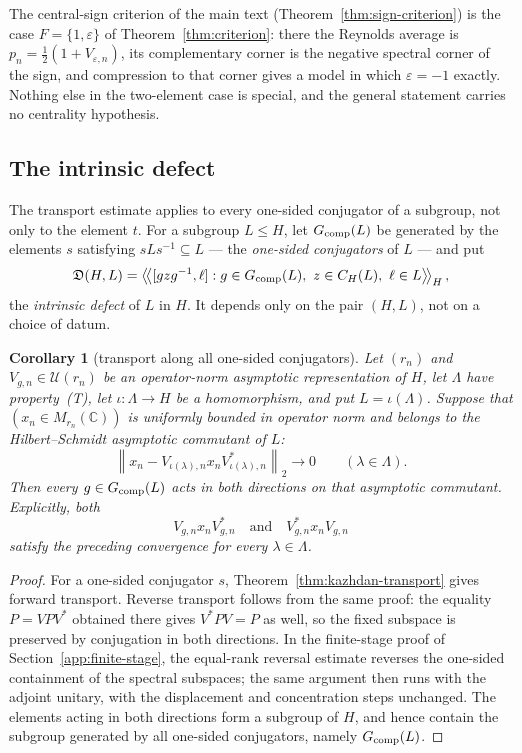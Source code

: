 \documentclass[11pt]{amsart}
\newcommand{\leanverified}[2]{\ignorespaces}
\newtheorem{corollary}[theorem]{Corollary}
\theoremstyle{definition}
\theoremstyle{remark}
\theoremstyle{plain}
\newcommand{\C}{\mathbb C}
\newcommand{\U}{\mathcal U}
\newcommand{\hsnorm}[1]{\left\lVert #1\right\rVert_{2}}
\begin{document}
The central-sign criterion of the main text
(Theorem~\ref{thm:sign-criterion}) is the case $F=\{1,\varepsilon\}$ of
Theorem~\ref{thm:criterion}: there the Reynolds average is
$p_n=\tfrac12(1+V_{\varepsilon,n})$, its complementary corner is the negative
spectral corner of the sign, and compression to that corner gives a model in
which $\varepsilon=-1$ exactly.  Nothing else in the two-element case is
special, and the general statement carries no centrality hypothesis.

\subsection{The intrinsic defect}

The transport estimate applies to every one-sided conjugator of a
subgroup, not only to the element $t$.  For a subgroup
$L\le H$, let $G_{\rm comp}(L)$ be generated by the elements $s$ satisfying
$sLs^{-1}\subseteq L$ --- the \emph{one-sided conjugators} of $L$ --- and put
\begin{equation}\label{eq:intrinsicdefect}
 \mathfrak D(H,L)=
 \left\langle\!\left\langle
 [gzg^{-1},\ell]:g\in G_{\rm comp}(L),\ z\in C_H(L),\ \ell\in L
 \right\rangle\!\right\rangle_H,
\end{equation}
the \emph{intrinsic defect} of $L$ in $H$.  It depends only on the
pair $(H,L)$, not on a choice of datum.

\begin{corollary}[transport along all one-sided conjugators]\label{cor:generaltransport}
Let $(r_n)$ and $V_{g,n}\in\U(r_n)$ be an operator-norm asymptotic
representation of $H$, let $\Lambda$ have property~\textup{(T)}, let
$\iota\colon\Lambda\to H$ be a homomorphism, and put $L=\iota(\Lambda)$.
Suppose that $(x_n\in M_{r_n}(\C))$ is uniformly bounded in operator norm
and belongs to the Hilbert--Schmidt asymptotic commutant of $L$:
\[
 \hsnorm{x_n-V_{\iota(\lambda),n}x_nV_{\iota(\lambda),n}^*}
 \longrightarrow0
 \qquad(\lambda\in\Lambda).
\]
Then every $g\in G_{\rm comp}(L)$ acts in both directions on that
asymptotic commutant.  Explicitly, both
\[
 V_{g,n}x_nV_{g,n}^*
 \quad\text{and}\quad
 V_{g,n}^*x_nV_{g,n}
\]
satisfy the preceding convergence for every $\lambda\in\Lambda$.
\leanverified{Sofic/KazhdanAsymptoticCommutant}{GroupApproximation.KazhdanAsymptoticCommutant.compressionGroup_transport_both}
\end{corollary}

\begin{proof}
For a one-sided conjugator $s$, Theorem~\ref{thm:kazhdan-transport} gives
forward transport.  Reverse transport follows from the same proof: the
equality $P=VPV^*$ obtained there gives $V^*PV=P$ as well, so the fixed
subspace is preserved by conjugation in both directions.  In the
finite-stage proof of Section~\ref{app:finite-stage}, the equal-rank
reversal estimate reverses the one-sided containment of the spectral
subspaces; the same argument then runs with the adjoint unitary, with
the displacement and concentration steps unchanged.  The elements acting in both
directions form a subgroup of $H$, and hence contain the subgroup generated
by all one-sided conjugators, namely $G_{\rm comp}(L)$.
\end{proof}
\end{document}

